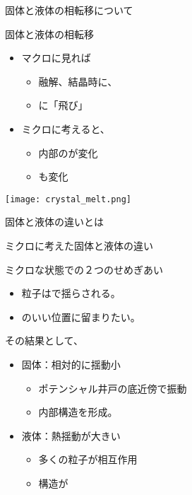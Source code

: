 \documentclass[uplatex,dvipdfmx,a4paper,11pt]{jsarticle}
\begin{document}
\begin{qlist}
\begin{qlist2}
		\qitem 固体と液体の相転移について
			\begin{center}
				\begin{minipage}{0.42\textwidth}
					\begin{itembox}[l]{固体と液体の相転移}
						\begin{itemize}
							\item マクロに見れば
							\begin{itemize}
								\item 融解、結晶時に、
								\item \qbox{}に「飛び」
							\end{itemize}
							\item ミクロに考えると、
							\begin{itemize}
								\item 内部の\qbox{}が変化
								\item \qbox{}も変化
							\end{itemize}
						\end{itemize}
					\end{itembox}
				\end{minipage}
				\begin{minipage}{0.42\textwidth}
					\begin{center}
					\texttt{[image: crystal\_melt.png]}
					\end{center}
				\end{minipage}
			\end{center}
			
			\qitem 固体と液体の違いとは
				\begin{itembox}[l]{ミクロに考えた固体と液体の違い}
					\begin{itembox}[l]{ミクロな状態での２つのせめぎあい}
						\begin{itemize}
							\item 粒子は\qbox{}で揺らされる。
							\item \qbox{}のいい位置に留まりたい。
						\end{itemize}
					\end{itembox}
					\begin{itembox}[l]{その結果として、}
						\begin{itemize}
							\item 固体：相対的に揺動小
							\begin{itemize}
								\item ポテンシャル井戸の底近傍で振動
								\item 内部構造を形成。
							\end{itemize}
							\item 液体：熱揺動が大きい
							\begin{itemize}
								\item 多くの粒子が相互作用
								\item 構造が\qbox{}
							\end{itemize}
						\end{itemize}
					\end{itembox}
				\end{itembox}


\end{qlist2}
\end{qlist}
\end{document}
